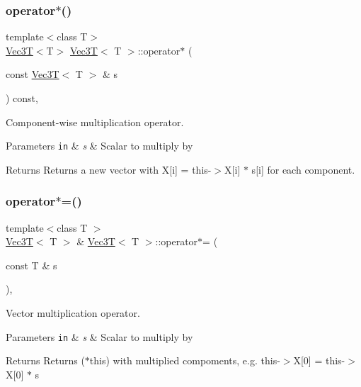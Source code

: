 \subsubsection{\texorpdfstring{operator$\ast$()}{operator*()}\hspace{0.1cm}{\footnotesize\ttfamily [2/2]}}
{\footnotesize\ttfamily template$<$class T$>$ \\
\hyperlink{classVec3T}{Vec3T}$<$T$>$ \hyperlink{classVec3T}{Vec3T}$<$ T $>$\+::operator$\ast$ (\begin{DoxyParamCaption}\item[{const \hyperlink{classVec3T}{Vec3T}$<$ T $>$ \&}]{s }\end{DoxyParamCaption}) const\hspace{0.3cm}{\ttfamily [inline]}, {\ttfamily [noexcept]}}



Component-\/wise multiplication operator. 


\begin{DoxyParams}[1]{Parameters}
\mbox{\tt in}  & {\em s} & Scalar to multiply by \\
\hline
\end{DoxyParams}
\begin{DoxyReturn}{Returns}
Returns a new vector with X\mbox{[}i\mbox{]} = this-\/$>$X\mbox{[}i\mbox{]} $\ast$ s\mbox{[}i\mbox{]} for each component. 
\end{DoxyReturn}
\mbox{\label{classVec3T_a0448e51b7f785b14df47092929cb73a3}} 
\subsubsection{\texorpdfstring{operator$\ast$=()}{operator*=()}}
{\footnotesize\ttfamily template$<$class T $>$ \\
\hyperlink{classVec3T}{Vec3T}$<$ T $>$ \& \hyperlink{classVec3T}{Vec3T}$<$ T $>$\+::operator$\ast$= (\begin{DoxyParamCaption}\item[{const T \&}]{s }\end{DoxyParamCaption})\hspace{0.3cm}{\ttfamily [inline]}, {\ttfamily [noexcept]}}



Vector multiplication operator. 


\begin{DoxyParams}[1]{Parameters}
\mbox{\tt in}  & {\em s} & Scalar to multiply by \\
\hline
\end{DoxyParams}
\begin{DoxyReturn}{Returns}
Returns ($\ast$this) with multiplied compoments, e.\+g. this-\/$>$X\mbox{[}0\mbox{]} = this-\/$>$X\mbox{[}0\mbox{]} $\ast$ s 
\end{DoxyReturn}
\mbox{\label{classVec3T_af1ab895de89a1a3143f58d2ce5d78bc2}} 
